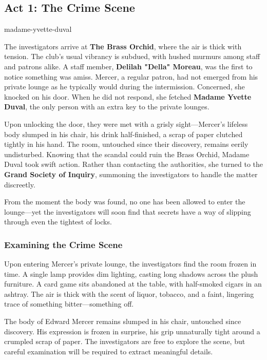 \subsection{Act 1: The Crime Scene}
{madame-yvette-duval}

The investigators arrive at \textbf{The Brass Orchid}, where the air is thick with tension. The club’s usual vibrancy is subdued, with hushed murmurs among staff and patrons alike. A staff member, \textbf{Delilah "Della" Moreau}, was the first to notice something was amiss. Mercer, a regular patron, had not emerged from his private lounge as he typically would during the intermission. Concerned, she knocked on his door. When he did not respond, she fetched \textbf{Madame Yvette Duval}, the only person with an extra key to the private lounges. 

Upon unlocking the door, they were met with a grisly sight—Mercer’s lifeless body slumped in his chair, his drink half-finished, a scrap of paper clutched tightly in his hand. The room, untouched since their discovery, remains eerily undisturbed. Knowing that the scandal could ruin the Brass Orchid, Madame Duval took swift action. Rather than contacting the authorities, she turned to the \textbf{Grand Society of Inquiry}, summoning the investigators to handle the matter discreetly.

From the moment the body was found, no one has been allowed to enter the lounge—yet the investigators will soon find that secrets have a way of slipping through even the tightest of locks.


\subsubsection{Examining the Crime Scene}

Upon entering Mercer's private lounge, the investigators find the room frozen in time. A single lamp provides dim lighting, casting long shadows across the plush furniture. A card game sits abandoned at the table, with half-smoked cigars in an ashtray. The air is thick with the scent of liquor, tobacco, and a faint, lingering trace of something bitter—something off.

The body of Edward Mercer remains slumped in his chair, untouched since discovery. His expression is frozen in surprise, his grip unnaturally tight around a crumpled scrap of paper. The investigators are free to explore the scene, but careful examination will be required to extract meaningful details.


